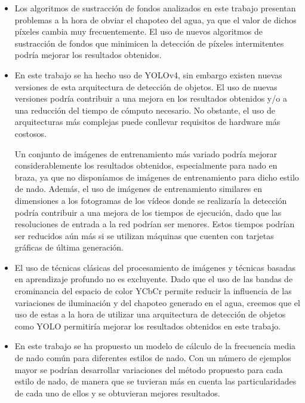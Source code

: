 \begin{itemize}
    \item Los algoritmos de sustracción de fondos analizados en este trabajo presentan problemas a la hora de obviar el chapoteo del agua, ya que el valor de dichos píxeles cambia muy frecuentemente. El uso de nuevos algoritmos de sustracción de fondos que minimicen la detección de píxeles intermitentes podría mejorar los resultados obtenidos.  
    
    \item En este trabajo se ha hecho uso de YOLOv4, sin embargo existen nuevas versiones de esta arquitectura de detección de objetos. El uso de nuevas versiones podría contribuir a una mejora en los resultados obtenidos y/o a una reducción del tiempo de cómputo necesario. No obstante, el uso de arquitecturas más complejas puede conllevar requisitos de hardware más costosos.
    
    Un conjunto de imágenes de entrenamiento más variado podría mejorar considerablemente los resultados obtenidos, especialmente para nado en braza, ya que no disponíamos de imágenes de entrenamiento para dicho estilo de nado. Además, el uso de imágenes de entrenamiento similares en dimensiones a los fotogramas de los vídeos donde se realizaría la detección podría contribuir a una mejora de los tiempos de ejecución, dado que las resoluciones de entrada a la red podrían ser menores. Estos tiempos podrían ser reducidos aún más si se utilizan máquinas que cuenten con tarjetas gráficas de última generación.
    
    \item El uso de técnicas clásicas del procesamiento de imágenes y técnicas basadas en aprendizaje profundo no es excluyente. Dado que el uso de las bandas de crominancia del espacio de color YCbCr permite reducir la influencia de las variaciones de iluminación y del chapoteo generado en el agua, creemos que el uso de estas a la hora de utilizar una arquitectura de detección de objetos como YOLO permitiría mejorar los resultados obtenidos en este trabajo. 

    \item En este trabajo se ha propuesto un modelo de cálculo de la frecuencia media de nado común para diferentes estilos de nado. Con un número de ejemplos mayor se podrían desarrollar variaciones del método propuesto para cada estilo de nado, de manera que se tuvieran más en cuenta las particularidades de cada uno de ellos y se obtuvieran mejores resultados.
\end{itemize}
